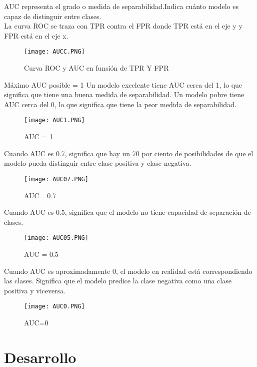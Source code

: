 \documentclass[10pt,a4paper]{article}
\begin{document}
AUC representa el grado o medida de separabilidad.Indica cuánto modelo es capaz de distinguir entre clases.\\

La curva ROC se traza con TPR contra el FPR donde TPR está en el eje y y FPR está en el eje x.
\begin{figure}[H]
 \centering
 \texttt{[image: AUCC.PNG]}
 \caption{Curva ROC y AUC en funsión de TPR Y FPR}
 \end{figure}
Máximo AUC posible = 1
Un modelo excelente tiene AUC cerca del 1, lo que significa que tiene una buena medida de separabilidad. Un modelo pobre tiene AUC cerca del 0, lo que significa que tiene la peor medida de separabilidad.
\begin{figure}[H]
\centering
\texttt{[image: AUC1.PNG]}
\caption{AUC = 1}
\end{figure}
Cuando AUC es 0.7, significa que hay un 70 por ciento de posibilidades de que el modelo pueda distinguir entre clase positiva y clase negativa.
\begin{figure}[H]
\centering
\texttt{[image: AUC07.PNG]}
\caption{AUC= 0.7}
\end{figure}

Cuando AUC es 0.5, significa que el modelo no tiene capacidad de separación de clases.
\begin{figure}[H]
\caption{AUC = 0.5}
\centering
\texttt{[image: AUC05.PNG]}
\end{figure}
Cuando AUC es aproximadamente 0, el modelo en realidad está correspondiendo las clases. Significa que el modelo predice la clase negativa como una clase positiva y viceversa.
\begin{figure}[H]
\centering
\texttt{[image: AUC0.PNG]}
\caption{AUC=0}
\end{figure}

\section{Desarrollo}
\end{document}
